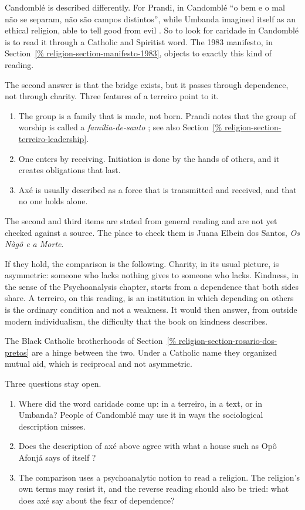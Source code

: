 Candombl\'e is described differently. For
Prandi, in Candombl\'e ``o bem e o mal
n\~ao se separam, n\~ao s\~ao campos
distintos'', while Umbanda imagined
itself as an ethical religion, able to
tell good from evil
\cite{prandi2004axe}. So to look for
caridade in Candombl\'e is to read it
through a Catholic and Spiritist word.
The 1983 manifesto, in
Section~\ref{%
religion-section-manifesto-1983},
objects to exactly this kind of reading.

The second answer is that the bridge
exists, but it passes through
dependence, not through charity. Three
features of a terreiro point to it.

\begin{enumerate}
\item The group is a family that is made,
not born. Prandi notes that the group of
worship is called a
\emph{família-de-santo}
\cite{prandi2004axe}; see also
Section~\ref{%
religion-section-terreiro-leadership}.
\item One enters by receiving. Initiation
is done by the hands of others, and it
creates obligations that last.
\item Ax\'e is usually described as a
force that is transmitted and received,
and that no one holds alone.
\end{enumerate}

The second and third items are stated
from general reading and are not yet
checked against a source. The place to
check them is Juana Elbein dos Santos,
\emph{Os N\`ag\^o e a Morte}.

If they hold, the comparison is the
following. Charity, in its usual
picture, is asymmetric: someone who
lacks nothing gives to someone who
lacks. Kindness, in the sense of the
Psychoanalysis chapter, starts from a
dependence that both sides share. A
terreiro, on this reading, is an
institution in which depending on
others is the ordinary condition and not
a weakness. It would then answer, from
outside modern individualism, the
difficulty that the book on kindness
describes.

The Black Catholic brotherhoods of
Section~\ref{%
religion-section-rosario-dos-pretos}
are a hinge between the two. Under a
Catholic name they organized mutual aid,
which is reciprocal and not asymmetric.

Three questions stay open.

\begin{enumerate}
\item Where did the word caridade come
up: in a terreiro, in a text, or in
Umbanda? People of Candombl\'e may use it
in ways the sociological description
misses.
\item Does the description of ax\'e above
agree with what a house such as Op\^o
Afonj\'a says of itself
\cite{barata2025ancestralidade}?
\item The comparison uses a
psychoanalytic notion to read a
religion. The religion's own terms may
resist it, and the reverse reading
should also be tried: what does ax\'e say
about the fear of dependence?
\end{enumerate}

